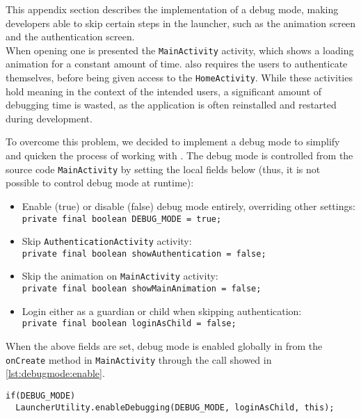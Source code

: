 This appendix section describes the implementation of a debug mode, making developers able to skip certain steps in the launcher, such as the animation screen and the authentication screen.\\

When opening \launcher one is presented the \lstinline{MainActivity} activity, which shows a loading animation for a constant amount of time.
\launcher also requires the users to authenticate themselves, before being given access to the \lstinline{HomeActivity}.
While these activities hold meaning in the context of the intended users, a significant amount of debugging time is wasted, as the application is often reinstalled and restarted during development. 

To overcome this problem, we decided to implement a debug mode to simplify and quicken the process of working with \launcher.
The debug mode is controlled from the source code \lstinline|MainActivity| by setting the local fields below (thus, it is not possible to control debug mode at runtime):

\begin{itemize}
\item Enable (true) or disable (false) debug mode entirely, overriding other settings:\\
\lstinline|private final boolean DEBUG_MODE = true;|
\item Skip \lstinline|AuthenticationActivity| activity:\\
\lstinline|private final boolean showAuthentication = false;|
\item Skip the animation on \lstinline|MainActivity| activity:\\
\lstinline|private final boolean showMainAnimation = false;|
\item Login either as a guardian or child when skipping authentication:\\
\lstinline|private final boolean loginAsChild = false;|
\end{itemize}

When the above fields are set, debug mode is enabled globally in \launcher from the \lstinline|onCreate| method in \lstinline|MainActivity| through the call showed in \cref{lst:debugmode:enable}.

\begin{lstlisting}[caption={Enable debug mode from \lstinline|MainActivity|.},label={lst:debugmode:enable}]  
if(DEBUG_MODE)
  LauncherUtility.enableDebugging(DEBUG_MODE, loginAsChild, this);
\end{lstlisting}

